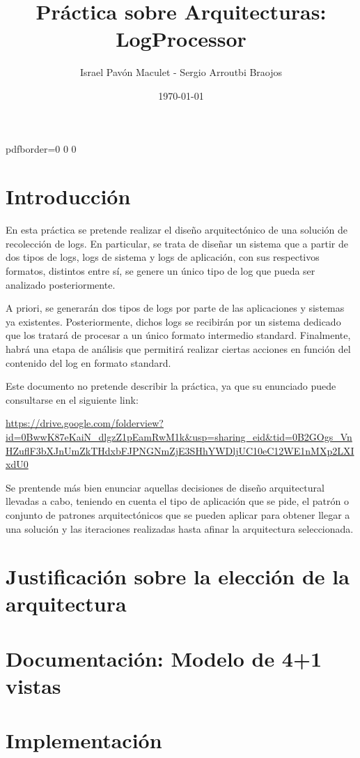 \documentclass[11pt]{article}
\title{\textbf{Práctica sobre Arquitecturas: LogProcessor}}
\author{Israel Pavón Maculet - Sergio Arroutbi Braojos}
\date{\today}
\begin{document}
\hypersetup
{   
pdfborder={0 0 0}
}
   
\maketitle

\pagebreak

\tableofcontents

\pagebreak

\section{Introducción}
En esta práctica se pretende realizar el diseño arquitectónico de una solución de recolección de logs. En particular, se trata de diseñar un sistema que a partir de dos tipos de logs, logs de sistema y logs de aplicación, con sus respectivos formatos, distintos entre sí, se genere un único tipo de log que pueda ser analizado posteriormente.

A priori, se generarán dos tipos de logs por parte de las aplicaciones y sistemas ya existentes. Posteriormente, dichos logs se recibirán por un sistema dedicado que los tratará de procesar a un único formato intermedio standard. Finalmente, habrá una etapa de análisis que permitirá realizar ciertas acciones en función del contenido del log en formato standard.

Este documento no pretende describir la práctica, ya que su enunciado puede consultarse en el siguiente link:

\url{https://drive.google.com/folderview?id=0BwwK87eKaiN_dlgzZ1pEamRwM1k&usp=sharing_eid&tid=0B2GOgs_VnHZuflF3bXJnUmZkTHdxbFJPNGNmZjE3SHhYWDljUC10eC12WE1nMXp2LXIxdU0}

Se prentende más bien enunciar aquellas decisiones de diseño arquitectural llevadas a cabo, teniendo en cuenta el tipo de aplicación que se pide, el patrón o conjunto de patrones arquitectónicos que se pueden aplicar para obtener llegar a una solución y las iteraciones realizadas hasta afinar la arquitectura seleccionada.

\pagebreak

\section{Justificación sobre la elección de la arquitectura}



\pagebreak

\section{Documentación: Modelo de 4+1 vistas}

\pagebreak

\section{Implementación}
\end{document}
